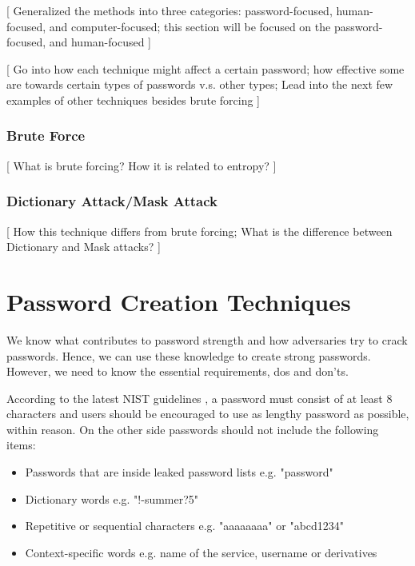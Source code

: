 \documentclass[acmsmall,nonacm]{acmart}
\begin{document}
\textcolor{beaver}{[ Generalized the methods into three categories: password-focused, human-focused, and computer-focused; this section will be focused on the password-focused, and human-focused ]}


\textcolor{beaver}{[ Go into how each technique might affect a certain password; how effective some are towards certain types of passwords v.s. other types; Lead into the next few examples of other techniques besides brute forcing ]}

\subsubsection{Brute Force}

\textcolor{beaver}{[ What is brute forcing? How it is related to entropy? ]}

\subsubsection{Dictionary Attack/Mask Attack} \label{dictionary/mask}
\textcolor{beaver}{[ How this technique differs from brute forcing; What is the difference between Dictionary and Mask attacks? ]}


\section{Password Creation Techniques} \label{creation}

We know what contributes to password strength  and how adversaries try to crack passwords. Hence, we can use these knowledge to create strong passwords. However, we need to know the essential requirements, dos and don'ts.

According to the latest NIST guidelines \cite{nist_2020}, a password must consist of at least 8 characters and users should be encouraged to use as lengthy password as possible, within reason. On the other side passwords should not include the following items:

\begin{itemize}
\item Passwords that are inside leaked password lists e.g. "password" 
\item Dictionary words e.g. "!-summer?5"
\item Repetitive or sequential characters e.g. "aaaaaaaa" or "abcd1234"
\item Context-specific words e.g. name of the service, username or derivatives
\end{itemize}
\end{document}

